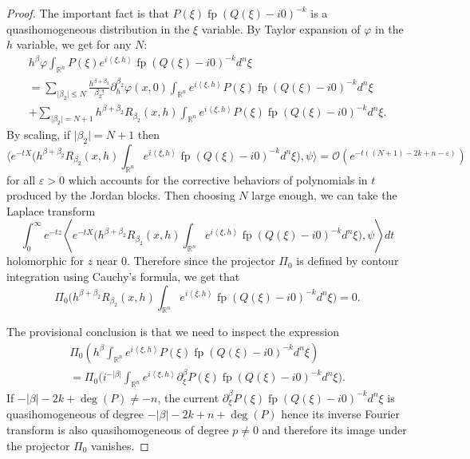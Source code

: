 \documentclass[10pt]{amsart}
\let\pazocal\mathscr
\theoremstyle{definition}
\let\euler X
\DeclareMathOperator*{\pf}{fp}
\begin{document}
\begin{proof}
The important fact is that $P(\xi)\pf(Q(\xi)-i0)^{-k}$ is a quasihomogeneous
distribution in the $\xi$ variable.
By Taylor expansion of $\varphi$ in the $h$ variable, we get for any $N$:
\begin{multline*}
h^\beta\varphi \int_{\mathbb{R}^n} P(\xi) e^{i\left\langle\xi,h\right\rangle}\pf(Q(\xi)-i0)^{-k} d^n\xi
\\ =\sum_{\vert\beta_2\vert\leqslant N} \frac{h^{\beta+\beta_2}}{\beta_2!} \partial_h^{\beta_2}\varphi(x,0) \int_{\mathbb{R}^n} e^{i\left\langle\xi,h\right\rangle}P(\xi)\pf(Q(\xi)-i0)^{-k} d^n\xi
\\ +\sum_{\vert \beta_2\vert=N+1} h^{\beta+\beta_2} R_{\beta_2}(x,h) \int_{\mathbb{R}^n} e^{i\left\langle\xi,h\right\rangle}
P(\xi)\pf(Q(\xi)-i0)^{-k} d^n\xi.
\end{multline*}
By scaling, if $\vert \beta_2\vert=N+1$ then
\[
\biggl\langle e^{-t\euler}\bigg(h^{\beta+\beta_2} R_{\beta_2}(x,h) \int_{\mathbb{R}^n} e^{i\left\langle\xi,h\right\rangle}\pf(Q(\xi)-i0)^{-k} d^n\xi\bigg), \psi \biggr\rangle=\pazocal{O}(e^{-t((N+1)-2k+n -\varepsilon)})
\]
for all $\varepsilon>0$ which accounts for the corrective behaviors of polynomials in $t$ produced by the Jordan blocks. Then choosing $N$ large enough, we can take the Laplace transform
\[
\int_0^\infty e^{-tz} \left\langle e^{-t\euler}\bigg(h^{\beta+\beta_2} R_{\beta_2}(x,h) \int_{\mathbb{R}^n} e^{i\left\langle\xi,h\right\rangle}\pf(Q(\xi)-i0)^{-k} d^n\xi\bigg), \psi \right\rangle dt
\]
holomorphic for $z$ near $0$. Therefore since the projector $\Pi_0$ is defined by contour integration using Cauchy's formula, we get
that
\[
\Pi_0\biggl(h^{\beta+\beta_2} R_{\beta_2}(x,h) \int_{\mathbb{R}^n} e^{i\left\langle\xi,h\right\rangle}\pf(Q(\xi)-i0)^{-k} d^n\xi\biggr)=0.
\]

The provisional conclusion is that we need to inspect the expression
\begin{multline*}
\Pi_0\left(h^\beta \int_{\mathbb{R}^n} e^{i\left\langle\xi,h\right\rangle}P(\xi) \pf(Q(\xi)-i0)^{-k} d^n\xi\right) \\ =
\Pi_0 \biggl(i^{-\vert\beta\vert} \int_{\mathbb{R}^n} e^{i\left\langle\xi,h\right\rangle} \partial_\xi^\beta P(\xi) \pf(Q(\xi)-i0)^{-k} d^n\xi \biggr).
\end{multline*}
If $-\vert\beta \vert-2k+\deg(P)\neq -n$, the current $ \partial_\xi^\beta P(\xi) \pf(Q(\xi)-i0)^{-k} d^n\xi$ is quasihomogeneous of degree $-\vert\beta \vert-2k+n+\deg(P) $ hence its inverse Fourier transform is also quasihomogeneous of degree $p\neq 0$ and therefore its image under the projector
$\Pi_0$ vanishes.


\end{proof}
\end{document}
